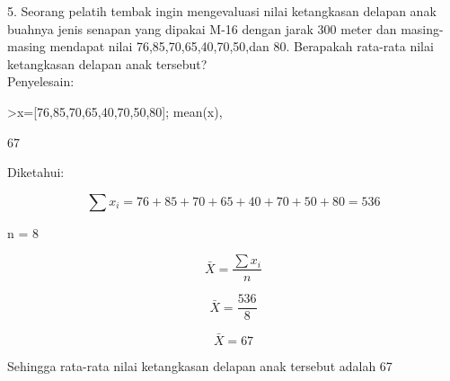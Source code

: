 \documentclass[12pt,Times new roman,letterpaper]{book}
\begin{document}
\begin{eulernootebook}
\begin{eulercomment}
\begin{eulercomment}
\begin{eulernootebook}
\begin{eulercomment}
\begin{eulercomment}
\begin{eulercomment}
\begin{eulercomment}
\begin{eulercomment}
\begin{eulercomment}
\begin{eulercomment}
\begin{eulercomment}
\begin{eulercomment}
\begin{eulercomment}
\begin{eulercomment}
\begin{eulercomment}
\begin{eulercomment}
\begin{eulercomment}
5. Seorang pelatih tembak ingin mengevaluasi nilai ketangkasan delapan
anak buahnya jenis senapan yang dipakai M-16 dengan jarak 300 meter
dan masing-masing mendapat nilai 76,85,70,65,40,70,50,dan 80.
Berapakah rata-rata nilai ketangkasan delapan anak tersebut?\\
Penyelesain:
\end{eulercomment}
\begin{eulerprompt}
>x=[76,85,70,65,40,70,50,80]; mean(x),
\end{eulerprompt}
\begin{euleroutput}
  67
\end{euleroutput}
\begin{eulercomment}
Diketahui:\\
\end{eulercomment}
\begin{eulerformula}
\[
\sum x_i={76+85+70+65+40+70+50+80}=536
\]
\end{eulerformula}
\begin{eulerttcomment}
                 n = 8
\end{eulerttcomment}
\begin{eulerformula}
\[
\bar{X} = \frac{\sum x_i}{n}
\]
\end{eulerformula}
\begin{eulerformula}
\[
\bar{X} = \frac{536}{8}
\]
\end{eulerformula}
\begin{eulerformula}
\[
\bar{X} = 67
\]
\end{eulerformula}
\begin{eulercomment}
Sehingga rata-rata nilai ketangkasan delapan anak tersebut adalah 67


\end{eulercomment}
\end{eulercomment}
\end{eulercomment}
\end{eulercomment}
\end{eulercomment}
\end{eulercomment}
\end{eulercomment}
\end{eulercomment}
\end{eulercomment}
\end{eulercomment}
\end{eulercomment}
\end{eulercomment}
\end{eulercomment}
\end{eulercomment}
\end{eulernootebook}
\end{eulercomment}
\end{eulercomment}
\end{eulernootebook}
\end{document}
